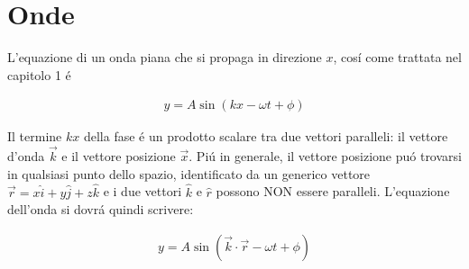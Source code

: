 \documentclass[17pt]{extarticle}
\begin{document}
\section{Onde}





L'equazione di un onda piana che si propaga in direzione $x$, cos\'i come trattata nel capitolo 1 \'e

\begin{eqnarray}
	y = A\sin\left(kx - \omega t + \phi\right)
\end{eqnarray}

Il termine $kx$ della fase \'e un prodotto scalare tra due vettori paralleli: il vettore d'onda $\vec{k}$ e il vettore posizione $\vec{x}$. Pi\'u in generale, il vettore posizione pu\'o trovarsi in qualsiasi punto dello spazio, identificato da un generico vettore $\vec{r} = x\hat{i} + y\hat{j} + z\hat{k}$ e i due vettori $\hat{k}$ e $\hat{r}$ possono NON essere paralleli. L'equazione dell'onda si dovr\'a quindi scrivere:  


\begin{eqnarray}
	y = A\sin\left(\vec{k}\cdot\vec{r} - \omega t + \phi\right)
\end{eqnarray}
\end{document}
